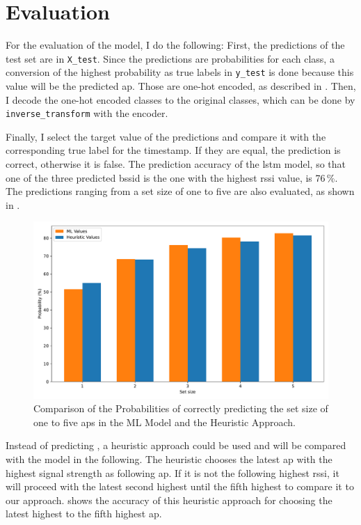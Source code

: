 \chapter{Evaluation}\label{ch:evaluation}

For the evaluation of the model, I do the following:
First, the predictions of the test set are in \texttt{X\_test}.
Since the predictions are probabilities for each class, a conversion of the highest probability as true labels in \texttt{y\_test} is done because this value will be the predicted \ac{ap}.
Those are one-hot encoded, as described in .
Then, I decode the one-hot encoded classes to the original classes, which can be done by \texttt{inverse\_transform} with the encoder.

Finally, I select the target value of the predictions and compare it with the corresponding true label for the timestamp.
If they are equal, the prediction is correct, otherwise it is false.
The \threeAP prediction accuracy of the \ac{lstm} model, so that one of the three predicted \ac{bssid} is the one with the highest \ac{rssi} value, is 76\,\%.
The predictions ranging from a set size of one to five are also evaluated, as shown in .

\begin{figure}[h]
    \centering
    \includegraphics*[scale=0.53]{images/comparison_ml_heuristic_1_to_5.pdf}
    \caption{Comparison of the Probabilities of correctly predicting the set size of one to five \acp{ap} in the ML Model and the Heuristic Approach.}
    \label{fig:comparison_ml_heuristic_1_to_5}
\end{figure}

Instead of predicting \threeAP, a heuristic approach could be used and will be compared with the model in the following.
The heuristic chooses the latest \ac{ap} with the highest signal strength as following \ac{ap}.
If it is not the following highest \ac{rssi}, it will proceed with the latest second highest until the fifth highest to compare it to our approach. %
 shows the accuracy of this heuristic approach for choosing the latest highest to the fifth highest \ac{ap}.

